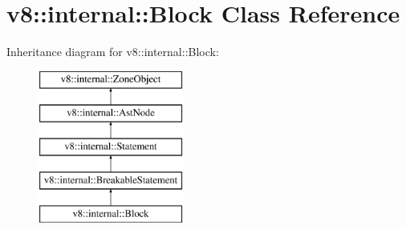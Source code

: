 \hypertarget{classv8_1_1internal_1_1_block}{}\section{v8\+:\+:internal\+:\+:Block Class Reference}
\label{classv8_1_1internal_1_1_block}
Inheritance diagram for v8\+:\+:internal\+:\+:Block\+:\begin{figure}[H]
\begin{center}
\leavevmode
\includegraphics[height=5.000000cm]{classv8_1_1internal_1_1_block}
\end{center}
\end{figure}
